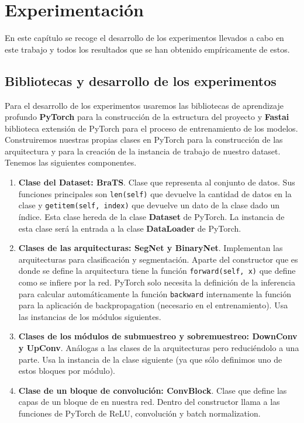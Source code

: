 \chapter{Experimentación}

En este capítulo se recoge el desarrollo de los experimentos llevados a cabo en este trabajo y todos los resultados que se han obtenido empíricamente de estos.

\section{Bibliotecas y desarrollo de los experimentos}

Para el desarrollo de los experimentos usaremos las bibliotecas de aprendizaje profundo \textbf{PyTorch} para la construcción de la estructura del proyecto y \textbf{Fastai} biblioteca extensión de PyTorch para el proceso de entrenamiento de los modelos. Construiremos nuestras propias clases en PyTorch para la construcción de las arquitectura y para la creación de la instancia de trabajo de nuestro dataset. Tenemos las siguientes componentes.

\begin{enumerate}
	\item \textbf{Clase del Dataset: BraTS}. Clase que representa al conjunto de datos. Sus funciones principales son \texttt{len(self)} que devuelve la cantidad de datos en la clase y \texttt{getitem(self, index)} que devuelve un dato de la clase dado un índice. Esta clase hereda de la clase \textbf{Dataset} de PyTorch.
	La instancia de esta clase será la entrada a la clase \textbf{DataLoader} de PyTorch.
	
	\item \textbf{Clases de las arquitecturas: SegNet y BinaryNet}. Implementan las arquitecturas para clasificación y segmentación. Aparte del constructor que es donde se define la arquitectura tiene la función \texttt{forward(self, x)} que define como se infiere por la red. PyTorch solo necesita la definición de la inferencia para calcular automáticamente la función \texttt{backward} internamente la función para la aplicación de backpropagation (necesario en el entrenamiento). Usa las instancias de los módulos siguientes.
	
	\item \textbf{Clases de los módulos de submuestreo y sobremuestreo: DownConv y UpConv}. Análogas a las clases de la arquitecturas pero reduciéndolo a una parte. Usa la instancia de la clase siguiente (ya que sólo definimos uno de estos bloques por módulo).
	
	\item \textbf{Clase de un bloque de convolución: ConvBlock}. Clase que define las capas de un bloque de en nuestra red. Dentro del constructor llama a las funciones de PyTorch de ReLU, convolución y batch normalization.
	
\end{enumerate}

